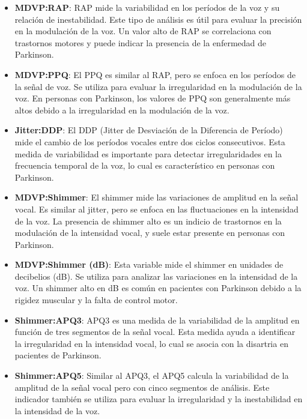 \documentclass[listof=nochaptergap,12pt,times,authoryear]{report}
\begin{document}
\begin{itemize}
    \item \textbf{MDVP:RAP}: RAP mide la variabilidad en los períodos de la voz y su relación de inestabilidad. Este tipo de análisis es útil para evaluar la precisión en la modulación de la voz. Un valor alto de RAP se correlaciona con trastornos motores y puede indicar la presencia de la enfermedad de Parkinson.
    
    \item \textbf{MDVP:PPQ}: El PPQ es similar al RAP, pero se enfoca en los períodos de la señal de voz. Se utiliza para evaluar la irregularidad en la modulación de la voz. En personas con Parkinson, los valores de PPQ son generalmente más altos debido a la irregularidad en la modulación de la voz.
    
    \item \textbf{Jitter:DDP}: El DDP (Jitter de Desviación de la Diferencia de Período) mide el cambio de los períodos vocales entre dos ciclos consecutivos. Esta medida de variabilidad es importante para detectar irregularidades en la frecuencia temporal de la voz, lo cual es característico en personas con Parkinson.
    
    \item \textbf{MDVP:Shimmer}: El shimmer mide las variaciones de amplitud en la señal vocal. Es similar al jitter, pero se enfoca en las fluctuaciones en la intensidad de la voz. La presencia de shimmer alto es un indicio de trastornos en la modulación de la intensidad vocal, y suele estar presente en personas con Parkinson.
    
    \item \textbf{MDVP:Shimmer (dB)}: Esta variable mide el shimmer en unidades de decibelios (dB). Se utiliza para analizar las variaciones en la intensidad de la voz. Un shimmer alto en dB es común en pacientes con Parkinson debido a la rigidez muscular y la falta de control motor.
    
    \item \textbf{Shimmer:APQ3}: APQ3 es una medida de la variabilidad de la amplitud en función de tres segmentos de la señal vocal. Esta medida ayuda a identificar la irregularidad en la intensidad vocal, lo cual se asocia con la disartria en pacientes de Parkinson.
    
    \item \textbf{Shimmer:APQ5}: Similar al APQ3, el APQ5 calcula la variabilidad de la amplitud de la señal vocal pero con cinco segmentos de análisis. Este indicador también se utiliza para evaluar la irregularidad y la inestabilidad en la intensidad de la voz.
    

\end{itemize}
\end{document}
